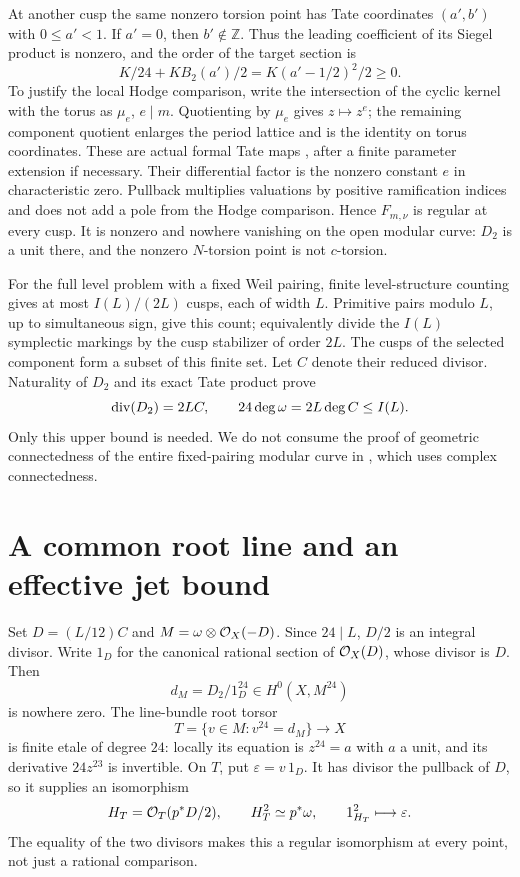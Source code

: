 \documentclass[11pt]{article}
\theoremstyle{remark}\newtheorem{remark}[theorem]{Remark}
\newcommand{\Z}{\mathbb Z}\newcommand{\Q}{\mathbb Q}
\begin{document}
At another cusp the same nonzero torsion point has Tate coordinates
$(a',b')$ with $0\leq a'<1$. If $a'=0$, then $b'\notin\Z$.
Thus the leading coefficient of its Siegel product is nonzero, and
the order of the target section is
\[
 K/24+K B_2(a')/2=K(a'-1/2)^2/2\geq0.
\]
To justify the local Hodge comparison, write the intersection of the
cyclic kernel with the torus as $\mu_e$, $e\mid m$. Quotienting by
$\mu_e$ gives $z\mapsto z^e$; the remaining component quotient enlarges
the period lattice and is the identity on torus coordinates. These are
actual formal Tate maps \cite[Section 2.5]{conrad}, after a finite
parameter extension if necessary. Their differential factor is the
nonzero constant $e$ in characteristic zero. Pullback multiplies valuations by positive
ramification indices and does not add a pole from the Hodge comparison.
Hence $F_{m,\nu}$ is regular at every cusp. It is nonzero and nowhere
vanishing on the open modular curve: $D_2$ is a unit there, and the
nonzero $N$-torsion point is not $c$-torsion.

For the full level problem with a fixed Weil pairing, finite
level-structure counting gives at most $I(L)/(2L)$ cusps, each of width
$L$. Primitive pairs modulo $L$, up to simultaneous sign, give this
count; equivalently divide the $I(L)$ symplectic markings by the cusp
stabilizer of order $2L$. The cusps of the selected component form a
subset of this finite set. Let $C$ denote their reduced divisor.
Naturality of $D_2$ and its exact Tate product prove
\[
 \operatorname{div}(D_2)=2LC,\qquad
 24\deg\omega=2L\deg C\leq I(L).
\]
Only this upper bound is needed. We do not consume the proof of
geometric connectedness of the entire fixed-pairing modular curve in
\cite[Theorem 4.2.1(1)]{conrad}, which uses complex connectedness.

\section{A common root line and an effective jet bound}
Set $D=(L/12)C$ and $M=\omega\otimes\mathcal O_X(-D)$. Since $24\mid L$,
$D/2$ is an integral divisor. Write $1_D$ for the canonical rational
section of $\mathcal O_X(D)$, whose divisor is $D$. Then
\[
 d_M=D_2/1_D^{24}\in H^0(X,M^{24})
\]
is nowhere zero. The line-bundle root torsor
\[
 T=\{v\in M:v^{24}=d_M\}\longrightarrow X
\]
is finite etale of degree $24$: locally its equation is $z^{24}=a$
with $a$ a unit, and its derivative $24z^{23}$ is invertible.
On $T$, put $\varepsilon=v\,1_D$. It has divisor the pullback of $D$,
so it supplies an isomorphism
\[
 H_T=\mathcal O_T(p^*D/2),\qquad
 H_T^2\simeq p^*\omega,\qquad 1_{H_T}^2\longmapsto\varepsilon.
\]
The equality of the two divisors makes this a regular isomorphism at
every point, not just a rational comparison.
\end{document}
